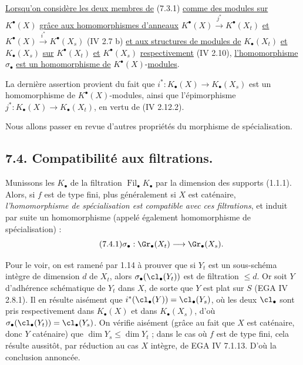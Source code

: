 
\noindent \uline{Lorsqu'on considère les deux membres de} (7.3.1) \uline{comme des modules sur} \(K^{\bullet}(X)\) \uline{grâce aux homomorphismes d'anneaux} \(K^{\bullet}(X)\xrightarrow{j^*}K^{\bullet}(X_t)\) \uline{et} \(K^{\bullet}(X)\xrightarrow{i^*}K^{\bullet}(X_s)\) (IV 2.7 b) \uline{et aux structures de modules de} \(K_\bullet(X_t)\) \uline{et} \(K_\bullet(X_s)\) \uline{sur} \(K^{\bullet}(X_t)\) \uline{et} \(K^{\bullet}(X_s)\) \uline{respectivement} (IV 2.10), \uline{l'homomorphisme} \(\sigma_\bullet\) \uline{est un homomorphisme de} \(K^{\bullet}(X)\)-\uline{modules}.

La dernière assertion provient du fait que \(i^*:K_\bullet(X)\to K_\bullet(X_s)\) est un homomorphisme de \(K^{\bullet}(X)\)-modules, ainsi que l'épimorphisme \(j^*:K_\bullet(X)\longrightarrow K_\bullet(X_t)\), en vertu de (IV 2.12.2).

Nous allons passer en revue d'autres propriétés du morphisme de spécialisation.

\subsection*{7.4. Compatibilité aux filtrations.}
Munissons les \(K_\bullet\) de la filtration \(\operatorname{Fil}_\bullet K_\bullet\) par la dimension des supports (1.1.1). Alors, si \(f\) est de type fini, plus généralement si \(X\) est caténaire, \emph{l'homomorphisme de spécialisation est compatible avec ces filtrations}, et induit par suite un homomorphisme (appelé également homomorphisme de spécialisation) :
\begin{equation}\tag{7.4.1}
  \sigma_\bullet:\Gr_\bullet(X_t)\longrightarrow \Gr_\bullet(X_s).
\end{equation}

Pour le voir, on est ramené par 1.14 à prouver que si \(Y_t\) est un sous-schéma intègre de dimension \(d\) de \(X_t\), alors \(\sigma_\bullet(\cl_\bullet(Y_t))\) est de filtration \(\leq d\). Or soit \(Y\) d'adhérence schématique de \(Y_t\) dans \(X\), de sorte que \(Y\) est plat sur \(S\) (EGA IV 2.8.1). Il en résulte aisément que \(i^*(\cl_\bullet(Y))=\cl_\bullet(Y_s)\), où les deux \(\cl_\bullet\) sont pris respectivement dans \(K_\bullet(X)\) et dans \(K_\bullet(X_s)\), d'où \(\sigma_\bullet(\cl_\bullet(Y_t))=\cl_\bullet(Y_s)\). On vérifie aisément (grâce au fait que \(X\) est caténaire, donc \(Y\) caténaire) que \(\dim Y_s\leq \dim Y_t\) ; dans le cas où \(f\) est de type fini, cela résulte aussitôt, par réduction au cas \(X\) intègre, de EGA IV 7.1.13. D'où la conclusion annoncée.

